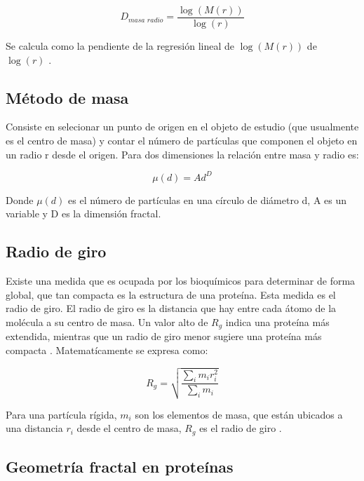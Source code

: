 \documentclass[11pt]{article}
\begin{document}
\begin{equation}
D_\textit{masa radio} = \frac{\log (M(r))}{\log (r)}
\end{equation}

Se calcula como la pendiente de la regresi\'{o}n lineal de $\log(M(r))$ de $\log(r)$ \cite{Mustafa1996}.


\subsection{M\'{e}todo de masa}
\label{subsec:subseccion2.5}


Consiste en selecionar un punto de
 origen en el objeto de estudio (que usualmente es el centro de masa) 
 y contar el n\'{u}mero de part\'{i}culas que componen el objeto en 
 un radio r desde el origen. Para dos dimensiones la relaci\'{o}n 
 entre masa y radio es:

\begin{equation}
\mu(d) = Ad^D
\end{equation}

Donde $\mu(d)$ es el n\'{u}mero de part\'{i}culas en una c\'{i}rculo de di\'{a}metro d, A es un variable y D es la dimensi\'{o}n fractal\cite{Mustafa1996, Nicolás2020}. 

\subsection{Radio de giro}
\label{subsec:subseccion2.6}


Existe una medida que es ocupada por los bioqu\'{i}micos para determinar de forma global, que tan compacta es la estructura de una prote\'{i}na. 
Esta medida es el radio de giro. El radio de giro es la distancia que hay entre cada \'{a}tomo de la mol\'{e}cula a 
su centro de masa. Un valor alto de $R_g$ indica una proteína más extendida, mientras que un radio de giro menor sugiere una proteína más compacta  \cite{Mroczka2012, Vicsek1992}. 
Matemat\'{i}camente se expresa como: 

\begin{equation}
R_g = \sqrt{\frac{\sum_{i} m_{i}r_{i}^{2}}{\sum_{i} m_{i}}}
\end{equation}

Para una partícula rígida, \( m_i \) son los elementos de masa, que est\'{a}n ubicados a una distancia \( r_i \) desde el centro de masa, \(R_g\) es el radio de giro \cite{IUPAC2019}.

   
\subsection{Geometr\'{i}a fractal en prote\'{i}nas}
\label{subsec:subseccion2.6}
\end{document}
